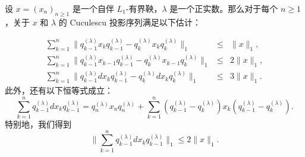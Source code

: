 \begin{proposition} \label{Randri}
设 $x = (x_n)_{n \ge 1}$ 是一个自伴 $L_1$-有界鞅，$\lambda$ 是一个正实数。那么对于每个 $n\ge 1$ ，关于 $x$ 和 $\lambda$ 的 Cuculescu 投影序列满足以下估计：

\begin{eqnarray}
\label{Est1} \sum_{k=1}^{n} \big\| q_{k-1}^{(\lambda)} x_k
q_{k-1}^{(\lambda)} - q_k^{(\lambda)} x_k q_k^{(\lambda)} \big\|_1
& \le & \|x\|_1, \\ \label{Est2} \sum_{k=1}^{n} \big\|
q_{k-1}^{(\lambda)} x_{k-1} q_{k-1}^{(\lambda)} - q_k^{(\lambda)}
x_{k-1} q_k^{(\lambda)}\big\|_1 & \le & 2 \|x\|_1, \\ \label{Est3}
\sum_{k=1}^{n} \big\| q_{k-1}^{(\lambda)} dx_k q_{k-1}^{(\lambda)}
- q_k^{(\lambda)} dx_k q_k^{(\lambda)} \big\|_1 & \le & 3 \|x\|_1.
\end{eqnarray}
此外，还有以下恒等式成立：
\begin{equation} \label{Ident1}
\sum_{k=1}^{n} q_{k-1}^{(\lambda)} dx_k  q_{k-1}^{(\lambda)}=
q_n^{(\lambda)}  x_n  q_n^{(\lambda)}+ \sum_{k=1}^{n}
(q_{k-1}^{(\lambda)}-q_{k}^{(\lambda)})x_k
(q_{k-1}^{(\lambda)}-q_{k}^{(\lambda)}).
\end{equation}
特别地，我们得到
\begin{equation} \label{Est4}
\Big\| \sum_{k=1}^{n} q_{k-1}^{(\lambda)} dx_k q_{k-1}^{(\lambda)}
\Big\|_1 \leq 2 \|x\|_1.
\end{equation}
\end{proposition}

